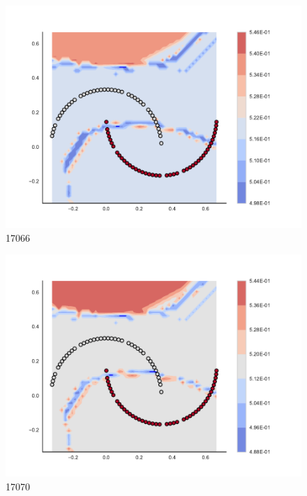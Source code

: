 \begin{subfigure}[b]{0.09\textwidth}
    \includegraphics[clip, trim=2.35cm 1.75cm 4.5cm 0cm,width=\textwidth]{img/convergence/17066.pdf}
    \caption{17066}
    \label{fig:convergence_17066}
\end{subfigure}
%
\begin{subfigure}[b]{0.09\textwidth}
    \includegraphics[clip, trim=2.35cm 1.75cm 4.5cm 0cm,width=\textwidth]{img/convergence/17070.pdf}
    \caption{17070}
    \label{fig:convergence_17070}
\end{subfigure}
%
